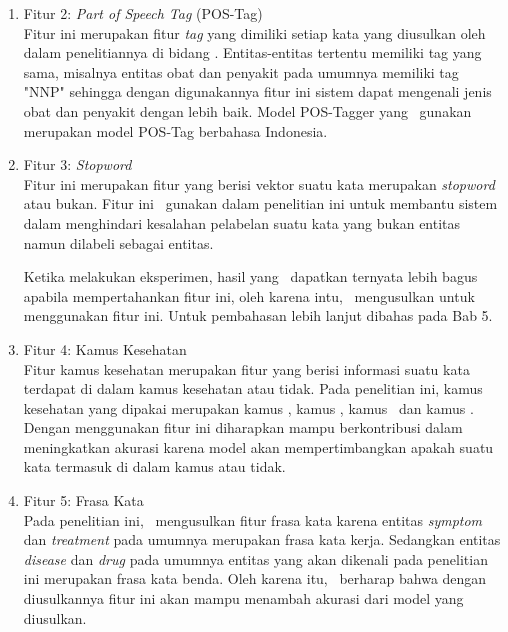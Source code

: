 \begin{enumerate}
	\item Fitur 2: \textit{Part of Speech Tag} (POS-Tag)\\
	Fitur ini merupakan fitur \textit{tag} yang dimiliki setiap kata yang diusulkan oleh \cite{abacha2011medical} dalam penelitiannya di bidang \mer. Entitas-entitas tertentu memiliki tag yang sama, misalnya entitas obat dan penyakit pada umumnya memiliki tag "NNP" sehingga dengan digunakannya fitur ini sistem dapat mengenali jenis obat dan penyakit dengan lebih baik. Model POS-Tagger yang \saya~gunakan merupakan model POS-Tag berbahasa Indonesia.
	
	\item Fitur 3: \textit{Stopword}\\
	Fitur ini merupakan fitur yang berisi vektor suatu kata merupakan \textit{stopword} atau bukan. Fitur ini \saya~gunakan dalam penelitian ini untuk membantu sistem dalam menghindari kesalahan pelabelan suatu kata yang bukan entitas namun dilabeli sebagai entitas.
	
	Ketika melakukan eksperimen, hasil yang \saya~dapatkan ternyata lebih bagus apabila mempertahankan fitur ini, oleh karena intu, \saya~mengusulkan untuk menggunakan fitur ini. Untuk pembahasan lebih lanjut dibahas pada Bab 5.
	
	\item Fitur 4: Kamus Kesehatan\\
	Fitur kamus kesehatan merupakan fitur yang berisi informasi suatu kata terdapat di dalam kamus kesehatan atau tidak. Pada penelitian ini, kamus kesehatan yang dipakai merupakan kamus \disease, kamus \symptom, kamus \drug~dan kamus \treatment. Dengan menggunakan fitur ini diharapkan mampu berkontribusi dalam meningkatkan akurasi karena model akan mempertimbangkan apakah suatu kata termasuk di dalam kamus atau tidak. 
	
	\item Fitur 5: Frasa Kata\\
	Pada penelitian ini, \saya~mengusulkan fitur frasa kata karena entitas \textit{symptom} dan \textit{treatment}  pada umumnya merupakan frasa kata kerja. Sedangkan entitas \textit{disease} dan \textit{drug} pada umumnya entitas yang akan dikenali pada penelitian ini merupakan frasa kata benda. Oleh karena itu, \saya~berharap bahwa dengan diusulkannya fitur ini akan mampu menambah akurasi dari model yang diusulkan.
	

\end{enumerate}
